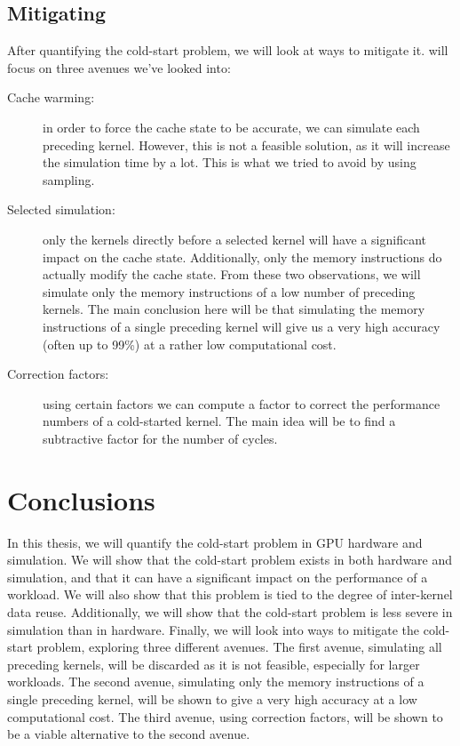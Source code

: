 \subsection{Mitigating}\label{subsec:mitigating}
After quantifying the cold-start problem, we will look at ways to mitigate it.
 will focus on three avenues we've looked into:
\begin{description}
    \item[Cache warming:] in order to force the cache state to be accurate, we can simulate each preceding kernel.
    However, this is not a feasible solution, as it will increase the simulation time by a lot.
    This is what we tried to avoid by using sampling.
    \item[Selected simulation:] only the kernels directly before a selected kernel will have a significant impact on the cache state.
    Additionally, only the memory instructions do actually modify the cache state.
    From these two observations, we will simulate only the memory instructions of a low number of preceding kernels.
    The main conclusion here will be that simulating the memory instructions of a single preceding kernel will give us a very high accuracy (often up to 99\%) at a rather low computational cost.
    \item[Correction factors:] using certain factors we can compute a factor to correct the performance numbers of a cold-started kernel.
    The main idea will be to find a subtractive factor for the number of cycles.
\end{description}

\section{Conclusions}\label{sec:conclusions}
In this thesis, we will quantify the cold-start problem in GPU hardware and simulation.
We will show that the cold-start problem exists in both hardware and simulation, and that it can have a significant impact on the performance of a workload.
We will also show that this problem is tied to the degree of inter-kernel data reuse.
Additionally, we will show that the cold-start problem is less severe in simulation than in hardware.
Finally, we will look into ways to mitigate the cold-start problem, exploring three different avenues.
The first avenue, simulating all preceding kernels, will be discarded as it is not feasible, especially for larger workloads.
The second avenue, simulating only the memory instructions of a single preceding kernel, will be shown to give a very high accuracy at a low computational cost.
The third avenue, using correction factors, will be shown to be a viable alternative to the second avenue. %
